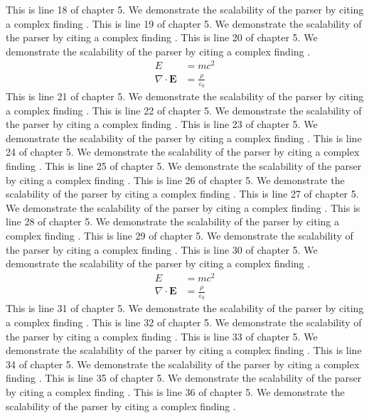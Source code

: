 This is line 18 of chapter 5. We demonstrate the scalability of the parser by citing a complex finding \cite{ref5_18}.
This is line 19 of chapter 5. We demonstrate the scalability of the parser by citing a complex finding \cite{ref5_19}.
This is line 20 of chapter 5. We demonstrate the scalability of the parser by citing a complex finding \cite{ref5_20}.
\begin{align*}
  E &= mc^2 \\
  \nabla \cdot \mathbf{E} &= \frac{\rho}{\varepsilon_0}
\end{align*}
This is line 21 of chapter 5. We demonstrate the scalability of the parser by citing a complex finding \cite{ref5_21}.
This is line 22 of chapter 5. We demonstrate the scalability of the parser by citing a complex finding \cite{ref5_22}.
This is line 23 of chapter 5. We demonstrate the scalability of the parser by citing a complex finding \cite{ref5_23}.
This is line 24 of chapter 5. We demonstrate the scalability of the parser by citing a complex finding \cite{ref5_24}.
This is line 25 of chapter 5. We demonstrate the scalability of the parser by citing a complex finding \cite{ref5_25}.
This is line 26 of chapter 5. We demonstrate the scalability of the parser by citing a complex finding \cite{ref5_26}.
This is line 27 of chapter 5. We demonstrate the scalability of the parser by citing a complex finding \cite{ref5_27}.
This is line 28 of chapter 5. We demonstrate the scalability of the parser by citing a complex finding \cite{ref5_28}.
This is line 29 of chapter 5. We demonstrate the scalability of the parser by citing a complex finding \cite{ref5_29}.
This is line 30 of chapter 5. We demonstrate the scalability of the parser by citing a complex finding \cite{ref5_30}.
\begin{align*}
  E &= mc^2 \\
  \nabla \cdot \mathbf{E} &= \frac{\rho}{\varepsilon_0}
\end{align*}
This is line 31 of chapter 5. We demonstrate the scalability of the parser by citing a complex finding \cite{ref5_31}.
This is line 32 of chapter 5. We demonstrate the scalability of the parser by citing a complex finding \cite{ref5_32}.
This is line 33 of chapter 5. We demonstrate the scalability of the parser by citing a complex finding \cite{ref5_33}.
This is line 34 of chapter 5. We demonstrate the scalability of the parser by citing a complex finding \cite{ref5_34}.
This is line 35 of chapter 5. We demonstrate the scalability of the parser by citing a complex finding \cite{ref5_35}.
This is line 36 of chapter 5. We demonstrate the scalability of the parser by citing a complex finding \cite{ref5_36}.
